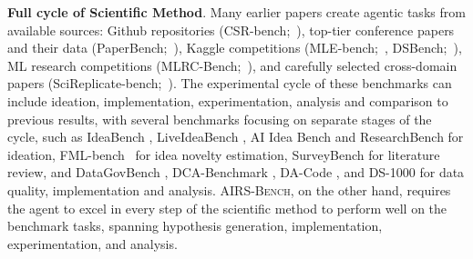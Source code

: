 \documentclass{fairmeta}
\newcommand{\airsbench}{\textsc{AIRS-Bench}}
\begin{document}
\textbf{Full cycle of Scientific Method}. Many earlier papers create agentic tasks from available sources: Github repositories (CSR-bench;~\citealp{xiao2025csrbenchbenchmarkingllmagents}), top-tier conference papers and their data (PaperBench;~\citealp{starace2025paperbenchevaluatingaisability}), Kaggle competitions (MLE-bench;~\citealp{chan2025mlebenchevaluatingmachinelearning}, DSBench;~\citealp{jing2025dsbenchfardatascience}), ML research competitions (MLRC-Bench;~\citealp{zhang2025mlrcbenchlanguageagentssolve}), and carefully selected cross-domain papers (SciReplicate-bench;~\citealp{xiang2025scireplicatebenchbenchmarkingllmsagentdriven}). The experimental cycle of these benchmarks can include ideation, implementation, experimentation, analysis and comparison to previous results, with several benchmarks focusing on separate stages of the cycle, such as IdeaBench \citep{guo2024ideabenchbenchmarkinglargelanguage}, LiveIdeaBench \citep{ruan2025liveideabenchevaluatingllmsdivergent}, AI Idea Bench \citep{qiu2025aiideabench2025} and ResearchBench \citep{liu2025researchbenchbenchmarkingllmsscientific} for ideation, FML-bench~\citep{zou2025fmlbenchbenchmarkautomaticml} for idea novelty estimation, SurveyBench \citep{sun2025surveybenchllmagentswriteacademic} for literature review, and DataGovBench \citep{liu2025datagovbenchbenchmarkingllmagents}, DCA-Benchmark \citep{huang2025dcabenchbenchmarkdatasetcuration}, DA-Code \citep{huang2024dacodeagentdatascience}, and DS-1000 \citep{lai2022ds1000naturalreliablebenchmark} for data quality, implementation and analysis. \airsbench, on the other hand, requires the agent to excel in every step of the scientific method to perform well on the benchmark tasks, spanning hypothesis generation, implementation, experimentation, and analysis.

\end{document}
